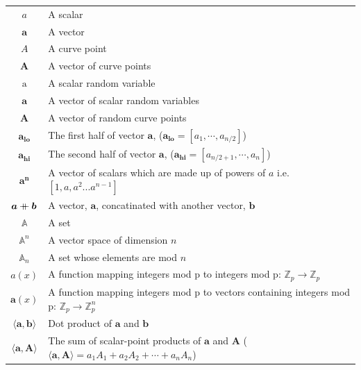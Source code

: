 \documentclass{article}
\renewcommand{\vec}[1]{\boldsymbol{#1}}
\newcommand{\ran}[1]{\mathrm{#1}}
\newcommand{\vecran}[1]{\mathbf{#1}}
\newcommand{\Z}{\mathbb{Z}}
\newcommand\concat{\mathbin{+\mkern-10mu+}} %
\newcommand{\dotp}[2]{\langle #1, #2 \rangle}
\newcommand{\opn}[1]{\operatorname{#1}}
\newcommand{\veclo}[1]{\vec{#1_{\opn{lo}}}}
\newcommand{\vechi}[1]{\vec{#1_{\opn{hi}}}}
\begin{document}
\begin{center}
\begin{tabular}{ c l }
	$a$                         & A scalar \\
	$\vec{a}$                   & A vector \\
	$A$                         & A curve point \\
	$\vec{A}$                   & A vector of curve points \\
	$\ran{a}$                   & A scalar random variable \\
	$\vecran{a}$                & A vector of scalar random variables \\
	$\vecran{A}$                & A vector of random curve points \\
	$\veclo{a}$                 & The first half of vector $\vec{a}$, ($\veclo{a} = [a_{1}, \cdots, a_{n/2}]$) \\
	$\vechi{a}$                 & The second half of vector $\vec{a}$, ($\vechi{a} = [a_{n/2+1}, \cdots, a_{n}]$) \\
	$\vec{a^n}$                 & A vector of scalars which are made up of powers of $a$ i.e. $[1,a,a^2... a^{n-1}]$\\
	$\vec{a} \concat \vec{b}$   & A vector, $\vec{a}$, concatinated with another vector, $\vec{b}$\\
	$\mathbb{A}$                & A set \\
	$\mathbb{A}^n$              & A vector space of dimension $n$ \\ 
	$\mathbb{A}_n$              & A set whose elements are mod $n$ \\ 
	$a(x)$                      & A function mapping integers mod p to integers mod p: $\Z_p \rightarrow \Z_p$ \\
	$\vec{a}(x)$                & A function mapping integers mod p to vectors containing integers mod p: $\Z_p \rightarrow \Z^n_p$ \\
	$\dotp{\vec{a}}{\vec{b}}$   & Dot product of $\vec{a}$ and $\vec{b}$ \\
	$\dotp{\vec{a}}{\vec{A}}$   & The sum of scalar-point products of $\vec{a}$ and $\vec{A}$ ($\dotp{\vec{a}}{\vec{A}} = a_1 A_1 + a_2 A_2 + \cdots + a_n A_n$) \\
\end{tabular}
\end{center}

\end{document}
